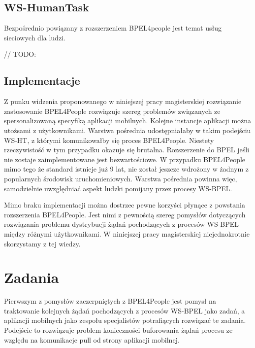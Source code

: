 \subsection{WS-HumanTask}

Bezpośrednio powiązany  z rozszerzeniem BPEL4people jest temat usług sieciowych dla ludzi.  

// TODO:

\subsection{Implementacje}

Z punku widzenia proponowanego w niniejszej pracy magisterskiej rozwiązanie zastosowanie BPEL4People rozwiązuje szereg problemów związanych ze spersonalizowaną specyfiką aplikacji mobilnych. Kolejne instancje aplikacji można utożsami z użytkownikami. Warstwa pośrednia udostępniałaby w takim podejściu WS-HT, z którymi komunikowałby się proces BPEL4People. Niestety rzeczywistość w tym przypadku okazuje się brutalna. Rozszerzenie do BPEL jeśli nie zostaje zaimplementowane jest bezwartościowe. W przypadku BPEL4People mimo tego że standard istnieje już 9 lat, nie został jeszcze wdrożony w żadnym z popularnych środowisk uruchomieniowych.  
Warstwa pośrednia powinna więc, samodzielnie uwzględniać aspekt ludzki pomijany przez procesy WS-BPEL. 

Mimo braku implementacji można dostrzec pewne korzyści płynące z powstania rozszerzenia BPEL4People. Jest nimi z pewnością szereg pomysłów dotyczących rozwiązania problemu dystrybucji żądań pochodzących z procesów WS-BPEL między różnymi użytkownikami. W niniejszej pracy magisterskiej niejednokrotnie skorzystamy z tej wiedzy. 


\section{Zadania}
\label{sec:tasks}

Pierwszym z pomysłów zaczerpniętych z BPEL4People jest pomysł na traktowanie kolejnych żądań pochodzących z procesów WS-BPEL jako zadań, a aplikacji mobilnych jako zespołu specjalistów potrafiących rozwiązać te zadania. Podejście to rozwiązuje problem konieczności buforowania żądań procesu ze względu na komunikacje pull od strony aplikacji mobilnej. 

